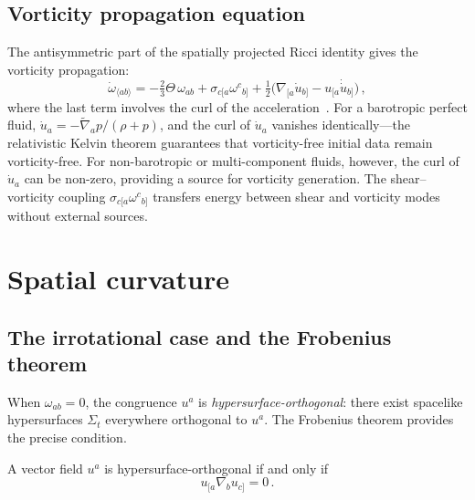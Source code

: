 \subsection{Vorticity propagation equation}
\label{sec:vort-prop}

The antisymmetric part of the spatially projected Ricci
identity gives the vorticity propagation:
\begin{equation}\label{eq:vort-prop}
\dot{\omega}_{\langle ab\rangle}
= -\tfrac{2}{3}\Theta\,\omega_{ab}
  + \sigma_{c[a}\omega^c{}_{b]}
  + \tfrac{1}{2}\bigl(\nabla_{[a}\dot{u}_{b]}
    - u_{[a}\dot{\dot{u}}_{b]}\bigr)\,,
\end{equation}
where the last term involves the curl of the
acceleration~\cite{EllisVanElst1999}.  For a barotropic perfect
fluid, $\dot{u}_a = -\tilde{\nabla}_a p/(\rho+p)$, and the
curl of $\dot{u}_a$ vanishes identically---the relativistic
Kelvin theorem guarantees that vorticity-free initial data remain
vorticity-free.  For non-barotropic or multi-component fluids,
however, the curl of $\dot{u}_a$ can be non-zero, providing a
source for vorticity generation.  The shear--vorticity coupling
$\sigma_{c[a}\omega^c{}_{b]}$ transfers energy between shear
and vorticity modes without external sources.


\section{Spatial curvature}\label{sec:spatial-curv}

\subsection{The irrotational case and the Frobenius theorem}
\label{sec:frobenius}

When $\omega_{ab} = 0$, the congruence $u^a$ is
\emph{hypersurface-orthogonal}: there exist spacelike
hypersurfaces $\Sigma_t$ everywhere orthogonal to $u^a$.  The
Frobenius theorem provides the precise condition.

\begin{theorem}[Frobenius]\label{thm:frobenius}
A vector field $u^a$ is hypersurface-orthogonal if and only if
\begin{equation}\label{eq:frobenius}
u_{[a}\nabla_b u_{c]} = 0\,.
\end{equation}
\end{theorem}

